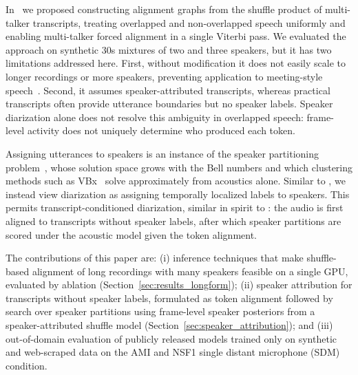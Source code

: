 

In~\cite{wiesner2026modeling} we proposed constructing alignment graphs from the shuffle product of multi-talker transcripts, treating overlapped and non-overlapped speech uniformly and enabling multi-talker forced alignment in a single Viterbi pass. We evaluated the approach on synthetic 30s mixtures of two and three speakers, but it has two limitations addressed here. First, without modification it does not easily scale to longer recordings or more speakers, preventing application to meeting-style speech~\cite{carletta2005ami, vinnikov2024notsofar, cornell2025recent}. Second, it assumes speaker-attributed transcripts, whereas practical transcripts often provide utterance boundaries but no speaker labels. Speaker diarization alone does not resolve this ambiguity in overlapped speech: frame-level activity does not uniquely determine who produced each token.

Assigning utterances to speakers is an instance of the speaker partitioning problem~\cite{brummer2010speaker}, whose solution space grows with the Bell numbers and which clustering methods such as VBx~\cite{landini2022bayesian} solve approximately from acoustics alone. Similar to \cite{9746225},  we instead view diarization as assigning temporally localized labels to speakers. This permits transcript-conditioned diarization, similar in spirit to \cite{shafey19_interspeech, park19_interspeech}: the audio is first aligned to transcripts without speaker labels, after which speaker partitions are scored under the acoustic model given the token alignment.

The contributions of this paper are: (i) inference techniques that make shuffle-based alignment of long recordings with many speakers feasible on a single GPU, evaluated by ablation (Section~\ref{sec:results_longform}); (ii) speaker attribution for transcripts without speaker labels, formulated as token alignment followed by search over speaker partitions using frame-level speaker posteriors from a speaker-attributed shuffle model (Section~\ref{sec:speaker_attribution}); and (iii) out-of-domain evaluation of publicly released models trained only on synthetic and web-scraped data on the AMI and NSF1 single distant microphone (SDM) condition.